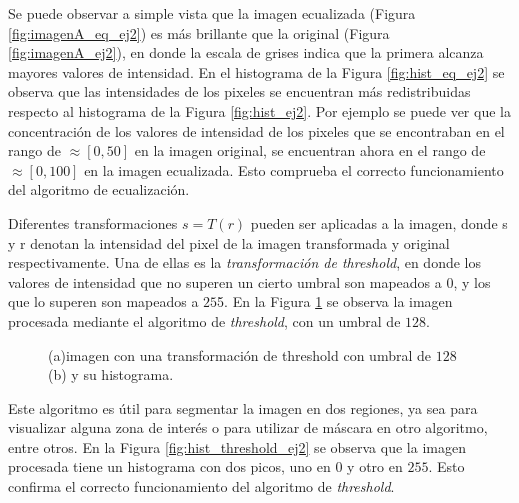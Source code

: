 \documentclass[11pt, twocolumn]{article}
\begin{document}
Se puede observar a simple vista que la imagen ecualizada (Figura \ref{fig:imagenA_eq_ej2}) es más brillante que la original (Figura \ref{fig:imagenA_ej2}), en donde la escala de grises indica que la primera alcanza mayores valores de intensidad. En el histograma de la Figura \ref{fig:hist_eq_ej2} se observa que las intensidades de los pixeles se encuentran más redistribuidas respecto al histograma de la Figura \ref{fig:hist_ej2}. Por ejemplo se puede ver que la concentración de los valores de intensidad de los pixeles que se encontraban en el rango de $\approx [0, 50]$ en la imagen original, se encuentran ahora en el rango de $\approx [0, 100]$ en la imagen ecualizada. Esto comprueba el correcto funcionamiento del algoritmo de ecualización.

Diferentes transformaciones $s = T(r)$ pueden ser aplicadas a la imagen, donde s y r denotan la intensidad del pixel de la imagen transformada y original respectivamente. Una de ellas es la \textit{transformación de threshold}, en donde los valores de intensidad que no superen un cierto umbral son mapeados a $0$, y los que lo superen son mapeados a $25$5. En la Figura \ref{fig:figuras_ej_2_threshold} se observa la imagen procesada mediante el algoritmo de \textit{threshold}, con un umbral de $128$.

\begin{figure}[htbp]
  \centering
  \hfill
  \hfill
  \caption{(a)imagen con una transformación de threshold con umbral de $128$ (b) y su histograma.}
  \label{fig:figuras_ej_2_threshold}
\end{figure}

Este algoritmo es útil para segmentar la imagen en dos regiones, ya sea para visualizar alguna zona de interés o para utilizar de máscara en otro algoritmo, entre otros. En la Figura \ref{fig:hist_threshold_ej2} se observa que la imagen procesada tiene un histograma con dos picos, uno en $0$ y otro en $255$. Esto confirma el correcto funcionamiento del algoritmo de \textit{threshold}.
\end{document}
